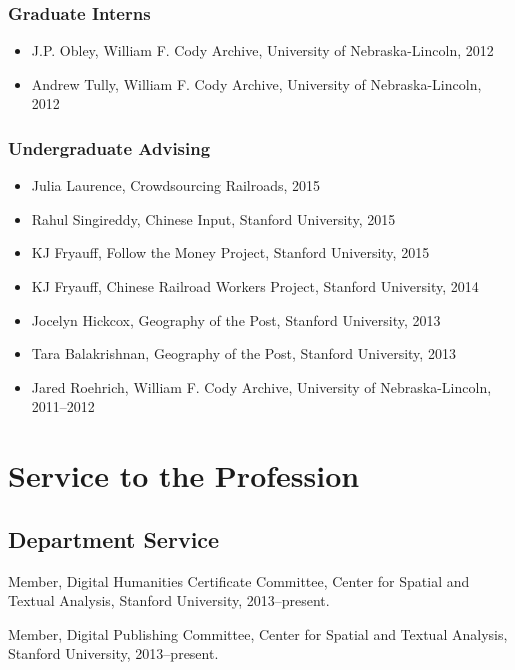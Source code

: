 \subsubsection{Graduate Interns}\label{graduate-interns}

\begin{itemize}
\tightlist
\item
  J.P. Obley, William F. Cody Archive, University of Nebraska-Lincoln,
  2012
\item
  Andrew Tully, William F. Cody Archive, University of Nebraska-Lincoln,
  2012
\end{itemize}

\subsubsection{Undergraduate Advising}\label{undergraduate-advising}

\begin{itemize}
\tightlist
\item
  Julia Laurence, Crowdsourcing Railroads, 2015
\item
  Rahul Singireddy, Chinese Input, Stanford University, 2015
\item
  KJ Fryauff, Follow the Money Project, Stanford University, 2015
\item
  KJ Fryauff, Chinese Railroad Workers Project, Stanford University,
  2014
\item
  Jocelyn Hickcox, Geography of the Post, Stanford University, 2013
\item
  Tara Balakrishnan, Geography of the Post, Stanford University, 2013
\item
  Jared Roehrich, William F. Cody Archive, University of
  Nebraska-Lincoln, 2011--2012
\end{itemize}

\section{Service to the Profession}\label{service-to-the-profession}

\subsection{Department Service}\label{department-service}

Member, Digital Humanities Certificate Committee, Center for Spatial and
Textual Analysis, Stanford University, 2013--present.

Member, Digital Publishing Committee, Center for Spatial and Textual
Analysis, Stanford University, 2013--present.

